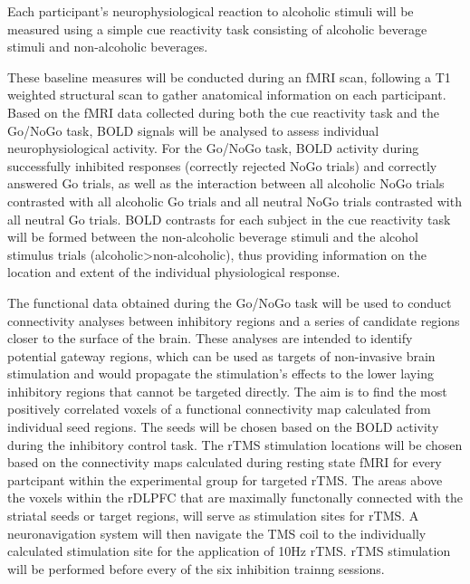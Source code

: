 \documentclass[12pt]{article}
\begin{document}
Each participant's neurophysiological reaction to alcoholic stimuli will be measured using a simple cue reactivity task consisting of alcoholic beverage stimuli and non-alcoholic beverages. 

These baseline measures will be conducted during an fMRI scan, following a T1 weighted structural scan to gather anatomical information on each participant. Based on the fMRI data collected during both the cue reactivity task and the Go/NoGo task, BOLD signals will be analysed to assess individual neurophysiological activity. For the Go/NoGo task, BOLD activity during successfully inhibited responses (correctly rejected NoGo trials) and correctly answered Go trials, as well as the interaction between all alcoholic NoGo trials contrasted with all alcoholic Go trials and all neutral NoGo trials contrasted with all neutral Go trials. BOLD contrasts for each subject in the cue reactivity task will be formed between the non-alcoholic beverage stimuli and the alcohol stimulus trials (alcoholic>non-alcoholic), thus providing information on the location and extent of the individual physiological response.

The functional data obtained during the Go/NoGo task will be used to conduct connectivity analyses between inhibitory regions and a series of candidate regions closer to the surface of the brain. These analyses are intended to identify potential gateway regions, which can be used as targets of non-invasive brain stimulation and would propagate the stimulation's effects to the lower laying inhibitory regions that cannot be targeted directly. The aim is to find the most positively correlated voxels of a functional connectivity map calculated from individual seed regions. The seeds will be chosen based on the BOLD activity during the inhibitory control task. The rTMS stimulation locations will be chosen based on the connectivity maps calculated during resting state fMRI for every partcipant within the experimental group for targeted rTMS. The areas above the voxels within the rDLPFC that are maximally functonally connected with the striatal seeds or target regions, will serve as stimulation sites for rTMS. A neuronavigation system will then navigate the TMS coil to the individually calculated stimulation site for the application of 10Hz rTMS. rTMS stimulation will be performed before every of the six inhibition trainng sessions.  
\end{document}
